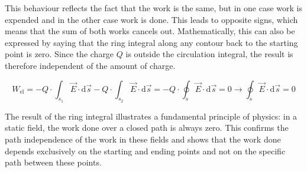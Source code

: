 \begin{frame}
{		%
		
		
		This behaviour reflects the fact that the work is the same, but in one case work is expended and in the other case work is done.
		This leads to opposite signs, which means that the sum of both works cancels out.
		Mathematically, this can also be expressed by saying that the ring integral along any contour back to the starting point is zero.
		Since the charge $Q$ is outside the circulation integral, the result is therefore independent of the amount of charge.
		
	\begin{equation}
	W_\mathrm{el} = - Q \cdot \int_{s_\mathrm{1}} \vec{E} \cdot \mathrm{d}\vec{s} -Q \cdot \int_{s_\mathrm{2}}\vec{E} \cdot \mathrm{d}\vec{s} = - Q \cdot \oint_{s}\vec{E} \cdot \mathrm{d}\vec{s} = 0
	\rightarrow \oint_{s}\vec{E} \cdot \mathrm{d}\vec{s} = 0
	\end{equation}


		The result of the ring integral illustrates a fundamental principle of physics: in a static field, the work done over a closed path
		is always zero. This confirms the path independence of the work in these fields and shows that the work done depends exclusively
		on the starting and ending points and not on the specific path between these points.
 
		  


}
\end{frame}
